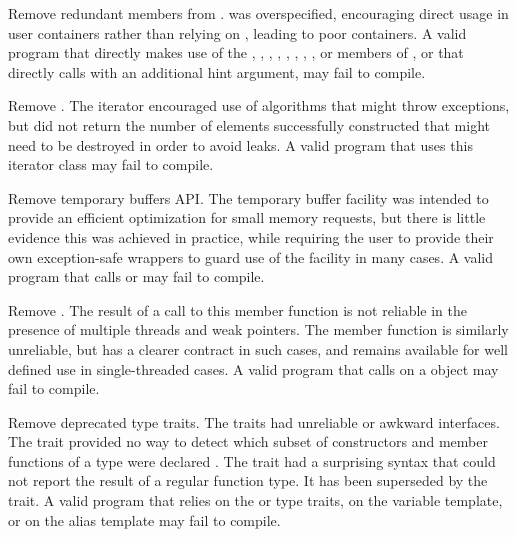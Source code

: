 \nodiffref
\change Remove redundant members from .
\rationale
{} was overspecified, encouraging direct usage in user containers
rather than relying on , leading to poor containers.
\effect
A valid \CppXVII{} program that directly makes use of the ,
, , ,
, , , , or
 members of , or that directly calls
 with an additional hint argument, may fail to compile.

\nodiffref
\change Remove .
\rationale
The iterator encouraged use of algorithms that might throw exceptions, but did
not return the number of elements successfully constructed that might need to
be destroyed in order to avoid leaks.
\effect
A valid \CppXVII{} program that uses this iterator class may fail to compile.

\nodiffref
\change Remove temporary buffers API.
\rationale
The temporary buffer facility was intended to provide an efficient optimization
for small memory requests, but there is little evidence this was achieved in
practice, while requiring the user to provide their own exception-safe wrappers
to guard use of the facility in many cases.
\effect
A valid \CppXVII{} program that calls  or
 may fail to compile.

\nodiffref
\change Remove .
\rationale
The result of a call to this member function is not reliable in the presence of
multiple threads and weak pointers. The member function  is
similarly unreliable, but has a clearer contract in such cases, and remains
available for well defined use in single-threaded cases.
\effect
A valid \CppXVII{} program that calls  on a 
object may fail to compile.

\change Remove deprecated type traits.
\rationale
The traits had unreliable or awkward interfaces. The 
trait provided no way to detect which subset of constructors and member
functions of a type were declared . The 
trait had a surprising syntax that could not report the result of a regular
function type. It has been superseded by the  trait.
\effect
A valid \CppXVII{} program that relies on the  or
 type traits, on the  variable template,
or on the  alias template may fail to compile.

